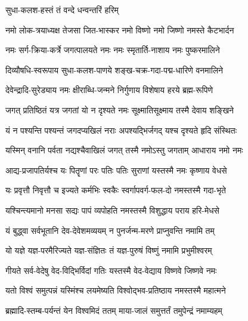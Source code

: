 

{सुधा-कलश-हस्तं तं वन्दे धन्वन्तरिं हरिम्}


\twolineshloka
{नमो लोक-त्रयाध्यक्ष तेजसा जित-भास्कर}
{नमो विष्णो नमो जिष्णो नमस्ते कैटभार्दन}%

\twolineshloka
{नमः सर्ग-क्रिया-कर्त्रे जगत्पालयते नमः}
{नमः स्मृतार्ति-नाशाय नमः पुष्करमालिने}%

\twolineshloka
{दिव्यौषधि-स्वरूपाय सुधा-कलश-पाणये}
{शङ्ख-चक्र-गदा-पद्म-धारिणे वनमालिने}%

\twolineshloka
{देवेन्द्रादि-सुरेड्याय नमः क्षीराब्धि-जन्मने}
{निर्गुणाय विशेषाय हरये ब्रह्म-रूपिणे}%

\twolineshloka
{जगत् प्रतिष्ठितं यत्र जगतां यो न दृश्यते}
{नमः सूक्ष्मातिसूक्ष्माय तस्मै देवाय शङ्खिने}%

\twolineshloka
{यं न पश्यन्ति पश्यन्तं जगदप्यखिलं नराः}
{अपश्यद्भिर्जगद् यश्च दृश्यते हृदि संस्थितः}%

\twolineshloka
{यस्मिन् वनानि पर्वता नद्यश्चैवाखिलं जगत्}
{तस्मै नमोऽस्तु जगताम् आधाराय नमो नमः}%

\twolineshloka
{आद्य-प्रजापतिर्यश्च यः पितॄणां परः पतिः}
{पतिः सुराणां यस्तस्मै नमः कृष्णाय वेधसे}%

\twolineshloka
{यः प्रवृत्तौ निवृत्तौ च इज्यते कर्मभिः स्वकैः}
{स्वर्गापवर्ग-फल-दो नमस्तस्मै गदा-भृते}%

\twolineshloka
{यश्चिन्त्यमानो मनसा सद्यः पापं व्यपोहति}
{नमस्तस्मै विशुद्धाय पराय हरि-मेधसे}%

\twolineshloka
{यं बुद्ध्वा सर्वभूतानि देव-देवेशमव्ययम्}
{न पुनर्जन्म-मरणे प्राप्नुवन्ति नमामि तम्}%

\twolineshloka
{यो यज्ञे यज्ञ-परमैरिज्यते यज्ञ-संज्ञितः}
{तं यज्ञ-पुरुषं विष्णुं नमामि प्रभुमीश्वरम्}%

\twolineshloka
{गीयते सर्व-वेदेषु वेद-विद्भिर्विदां गतिः}
{यस्तस्मै वेद-वेद्याय विष्णवे जिष्णवे नमः}%

\twolineshloka
{यतो विश्वं समुत्पन्नं यस्मिंश्च लयमेष्यति}
{विश्वोद्भव-प्रतिष्ठाय नमस्तस्मै महात्मने}%

\twolineshloka
{ब्रह्मादि-स्तम्ब-पर्यन्तं येन विश्वमिदं ततम्}
{माया-जालं समुत्तर्तं तमुपेन्द्रं नमाम्यहम्}%

